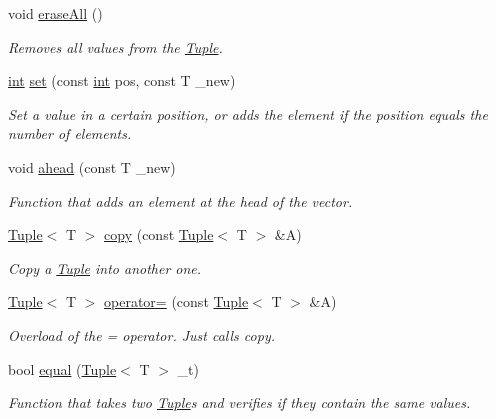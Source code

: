 \begin{DoxyCompactItemize}
void \mbox{\hyperlink{class_tuple_ae36c533bd6e97ac45a2ed69a0c4760e4}{erase\+All}} ()
\begin{DoxyCompactList}\small\item\em Removes all values from the {\ttfamily \mbox{\hyperlink{class_tuple}{Tuple}}}. \end{DoxyCompactList}\item 
\mbox{\hyperlink{draw_8hh_aa620a13339ac3a1177c86edc549fda9b}{int}} \mbox{\hyperlink{class_tuple_a6ecd34c0308891b7bec87b4736a6eaa5}{set}} (const \mbox{\hyperlink{draw_8hh_aa620a13339ac3a1177c86edc549fda9b}{int}} pos, const T \+\_\+new)
\begin{DoxyCompactList}\small\item\em Set a value in a certain position, or adds the element if the position equals the number of elements. \end{DoxyCompactList}\item 
void \mbox{\hyperlink{class_tuple_a1173bba1687b01721f9e4e4c73de0d2a}{ahead}} (const T \+\_\+new)
\begin{DoxyCompactList}\small\item\em Function that adds an element at the head of the vector. \end{DoxyCompactList}\item 
\mbox{\hyperlink{class_tuple}{Tuple}}$<$ T $>$ \mbox{\hyperlink{class_tuple_ac4b525e02b40a646ebd4f600fe78d00f}{copy}} (const \mbox{\hyperlink{class_tuple}{Tuple}}$<$ T $>$ \&A)
\begin{DoxyCompactList}\small\item\em Copy a \mbox{\hyperlink{class_tuple}{Tuple}} into another one. \end{DoxyCompactList}\item 
\mbox{\hyperlink{class_tuple}{Tuple}}$<$ T $>$ \mbox{\hyperlink{class_tuple_ab47559b59159610317779405337c2b44}{operator=}} (const \mbox{\hyperlink{class_tuple}{Tuple}}$<$ T $>$ \&A)
\begin{DoxyCompactList}\small\item\em Overload of the = operator. Just calls {\ttfamily copy}. \end{DoxyCompactList}\item 
bool \mbox{\hyperlink{class_tuple_a68d1d3aaecc187f8f78b46f4e1b48260}{equal}} (\mbox{\hyperlink{class_tuple}{Tuple}}$<$ T $>$ \+\_\+t)
\begin{DoxyCompactList}\small\item\em Function that takes two {\ttfamily \mbox{\hyperlink{class_tuple}{Tuple}}}s and verifies if they contain the same values. \end{DoxyCompactList}\item 

\end{DoxyCompactItemize}
